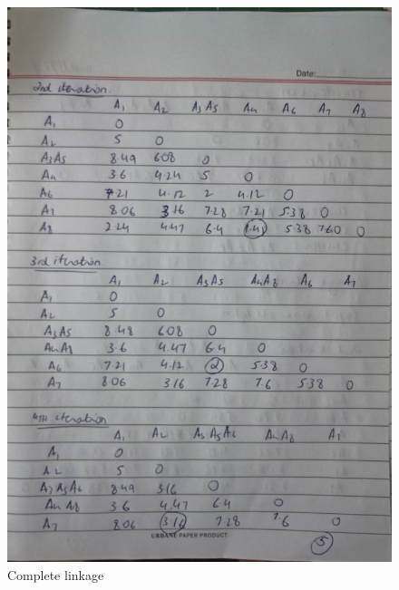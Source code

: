 \documentclass[12pt]{article}
\begin{document}
\begin{figure}
  \includegraphics[width=\linewidth]{5.jpg}
  \caption{Complete linkage}
  \label{pic5}
\end{figure}
\end{document}
